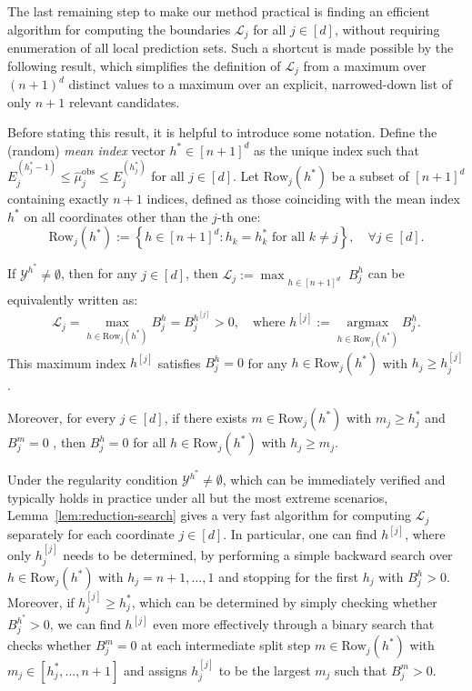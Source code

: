 The last remaining step to make our method practical is finding an efficient algorithm for computing the boundaries $\mathcal{L}_j$ for all $j \in [d]$, without requiring enumeration of all local prediction sets. 
Such a shortcut is made possible by the following result, which simplifies the definition of $\mathcal{L}_j$ from a maximum over $(n+1)^d$ distinct values to a maximum over an explicit, narrowed-down list of only $n+1$ relevant candidates.

Before stating this result, it is helpful to introduce some notation. 
Define the (random) \emph{mean index} vector $h^* \in [n+1]^d$ as the unique index such that $E^{(h^*_j-1)}_j \le \hat{\mu}_j^\mathrm{obs} \le E^{(h^*_j)}_j$ for all $j \in [d]$.
Let $\mathrm{Row}_j(h^*)$ be a subset of $[n+1]^d$ containing exactly $n+1$ indices, defined as those coinciding with the mean index $h^*$ on all coordinates other than the $j$-th one:
\[
\mathrm{Row}_j(h^*):=\left\{h\in[n{+}1]^d : h_k = h^*_k \text{ for all } k\neq j \right\}, \quad\forall j \in [d].
\]

\begin{lemma}
If $\mathcal{Y}^{h^*} \neq \emptyset$, then for any $j \in [d]$, then $\mathcal{L}_j := \max_{\substack{h \in [n+1]^d}}B^h_j$ can be equivalently written as:
    \begin{align*}
    \mathcal{L}_j= \max_{h \in \mathrm{Row}_j(h^*)} B^h_j = B^{h^{[j]}}_j > 0,
      \quad
      \text{where }h^{[j]} := \operatorname*{argmax}_{h \in \mathrm{Row}_j(h^*)} B^h_j.
    \end{align*}
    This maximum index $h^{[j]}$ satisfies $B^{h}_j= 0$ for any $h \in \mathrm{Row}_j(h^*)$ with $h_j \geq h^{[j]}_j$. 
    
    Moreover, for every $j \in [d]$, if there exists $m\in\mathrm{Row}_j(h^*)$ with $m_j\geq h^*_j$ and $B^m_j=0$
    , then $B^h_j=0$ for all $h\in\mathrm{Row}_j(h^*)$ with $h_j \geq m_j$.
    \label{lem:reduction-search}
\end{lemma}

Under the regularity condition $\mathcal{Y}^{h^*} \neq \emptyset$, which can be immediately verified and typically holds in practice under all but the most extreme scenarios, Lemma~\ref{lem:reduction-search} gives a very fast algorithm for computing $\mathcal{L}_j$ separately for each coordinate $j \in [d]$.
In particular, one can find $h^{[j]}$, where only $h^{[j]}_j$ needs to be determined, by performing a simple
backward search over $h \in \mathrm{Row}_j(h^*)$ with $h_j = n+1,\ldots,1$ and stopping for the first $h_j$ with $B^h_j > 0$.
Moreover, if $h^{[j]}_j \geq h^*_j$, which can be determined by simply checking whether $B^{h^*}_j > 0$,
we can find $h^{[j]}$ even more effectively through a binary search that checks whether $B^m_j=0$ at each intermediate split step $m \in \mathrm{Row}_j(h^*)$ with $m_j \in [h^*_j,...,n+1]$ and assigns $h^{[j]}_j$ to be the largest $m_j$ such that $B^{m}_j > 0$.

